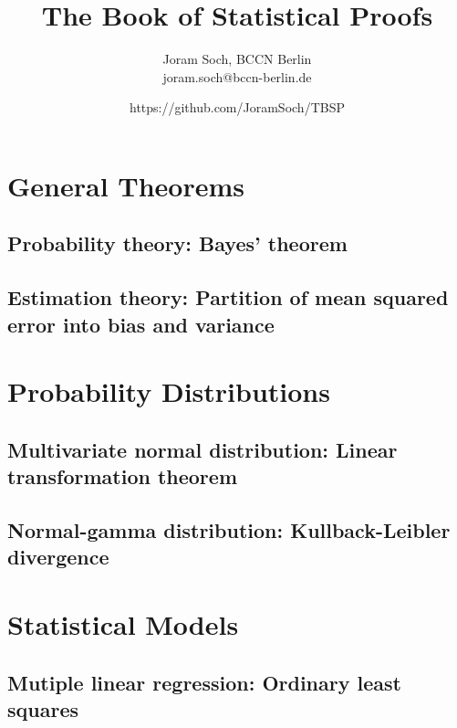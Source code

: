 \documentclass[a4paper,12pt]{book}
\title{The Book of Statistical Proofs}
\author{Joram Soch, BCCN Berlin \\ joram.soch@bccn-berlin.de}
\date{https://github.com/JoramSoch/TBSP}
\begin{document}
\maketitle

\pagebreak
{}
\tableofcontents

\newpage
{}


\chapter{General Theorems} \newpage

\section{Probability theory: Bayes' theorem}
\label{sec:prob-bayes}


\section{Estimation theory: Partition of mean squared error into bias and variance}
\label{sec:mse-bnv}



\chapter{Probability Distributions} \newpage

\section{Multivariate normal distribution: Linear transformation theorem}
\label{sec:mvn-ltt}


\section{Normal-gamma distribution: Kullback-Leibler divergence}
\label{sec:ng-kl}



\chapter{Statistical Models} \newpage

\section{Mutiple linear regression: Ordinary least squares}
\label{sec:mlr-ols}

\end{document}
